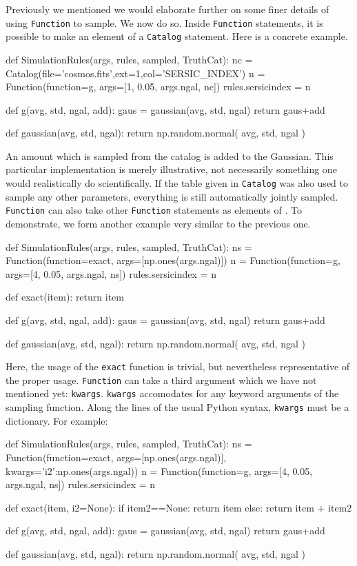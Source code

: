 \documentclass[11pt]{book}
\newcommand{\codett}[1]{\lstinline{#1}}
\newcommand{\py}{Python}
\begin{document}
Previously we mentioned we would elaborate further on some finer details of using \codett{Function} to sample.
We now do so.
Inside \codett{Function} statements, it is possible to make an element of \simargs{} a \codett{Catalog} statement.
Here is a concrete example.

\begin{code}
def SimulationRules(args, rules, sampled, TruthCat):
    nc = Catalog(file='cosmos.fits',ext=1,col='SERSIC_INDEX')
    n = Function(function=g, args=[1, 0.05, args.ngal, nc])
    rules.sersicindex = n

def g(avg, std, ngal, add):
    gaus = gaussian(avg, std, ngal)
    return gaus+add

def gaussian(avg, std, ngal):
    return np.random.normal( avg, std, ngal )
\end{code}

\noindent An amount which is sampled from the catalog is added to the Gaussian.
This particular implementation is merely illustrative, not necessarily
something one would realistically do scientifically.
If the table given in \codett{Catalog} was also used to sample any other parameters,
everything is still automatically jointly sampled.
\codett{Function} can also take other \codett{Function} statements as elements of \simargs{}.
To demonstrate, we form another example very similar to the previous one.

\begin{code}
def SimulationRules(args, rules, sampled, TruthCat):
    ns = Function(function=exact, args=[np.ones(args.ngal)])
    n = Function(function=g, args=[4, 0.05, args.ngal, ns])
    rules.sersicindex = n

def exact(item):
    return item

def g(avg, std, ngal, add):
    gaus = gaussian(avg, std, ngal)
    return gaus+add

def gaussian(avg, std, ngal):
    return np.random.normal( avg, std, ngal )
\end{code}

\noindent Here, the usage of the \codett{exact} function is trivial, but nevertheless
representative of the proper usage.
\codett{Function} can take a third argument which we have not mentioned yet: \codett{kwargs}.
\codett{kwargs} accomodates for any keyword arguments of the sampling function.
Along the lines of the usual \py{} syntax, \codett{kwargs} must be a dictionary.
For example:

\begin{code}
def SimulationRules(args, rules, sampled, TruthCat):
    ns = Function(function=exact, args=[np.ones(args.ngal)], kwargs={'i2':np.ones(args.ngal)})
    n = Function(function=g, args=[4, 0.05, args.ngal, ns])
    rules.sersicindex = n

def exact(item, i2=None):
    if item2==None:
        return item
    else:
        return item + item2

def g(avg, std, ngal, add):
    gaus = gaussian(avg, std, ngal)
    return gaus+add

def gaussian(avg, std, ngal):
    return np.random.normal( avg, std, ngal )
\end{code}
\end{document}
